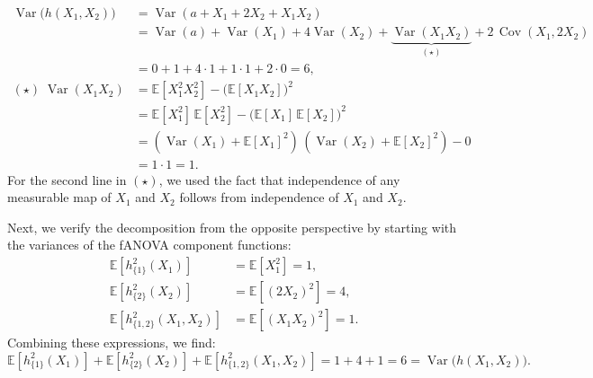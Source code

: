 \begin{align*}
\operatorname{Var}\big(h(X_1,X_2)\big)
&= \operatorname{Var}(a + X_1 + 2X_2 + X_1X_2) \\
&= \operatorname{Var}(a) + \operatorname{Var}(X_1) + 4\operatorname{Var}(X_2)
   + \underbrace{\operatorname{Var}(X_1X_2)}_{(\star)}
   + 2\,\operatorname{Cov}(X_1,2X_2) \\
&= 0 + 1 + 4 \cdot 1 + 1 \cdot 1 + 2\cdot 0 = 6, \\[0.3em]
(\star)\;\operatorname{Var}(X_1X_2)
&= \mathbb{E}[X_1^2 X_2^2] - \big(\mathbb{E}[X_1 X_2]\big)^2 \\
&=\mathbb{E}[X_1^2]\,\mathbb{E}[X_2^2]
   - \big(\mathbb{E}[X_1]\,\mathbb{E}[X_2]\big)^2 \\
&= (\operatorname{Var}(X_1)+\mathbb{E}[X_1]^2)\,
   (\operatorname{Var}(X_2)+\mathbb{E}[X_2]^2) - 0 \\
&= 1\cdot 1 = 1.
\end{align*}
For the second line in $(\star)$, we used the fact that independence of any measurable map of $X_1$ and $X_2$ follows from independence of $X_1$ and $X_2$.

Next, we verify the decomposition from the opposite perspective by starting with the variances of the fANOVA component functions:
\begin{align*}
\mathbb{E}[h_{\{1\}}^2(X_1)] 
    &= \mathbb{E}[X_1^2] 
    = 1, \\[0.5em]
\mathbb{E}[h_{\{2\}}^2(X_2)] 
    &= \mathbb{E}[(2X_2)^2] 
    = 4, \\[0.5em]
\mathbb{E}[h_{\{1,2\}}^2(X_1,X_2)] 
    &= \mathbb{E}[(X_1 X_2)^2] 
    = 1.
\end{align*}
Combining these expressions, we find:
\[
 \mathbb{E}[h_{\{1\}}^2(X_1)] + \mathbb{E}[h_{\{2\}}^2(X_2)] + \mathbb{E}[h_{\{1,2\}}^2(X_1,X_2)] 
 = 1 + 4 + 1 = 6
 = \operatorname{Var}\big(h(X_1,X_2)\big).
\]








